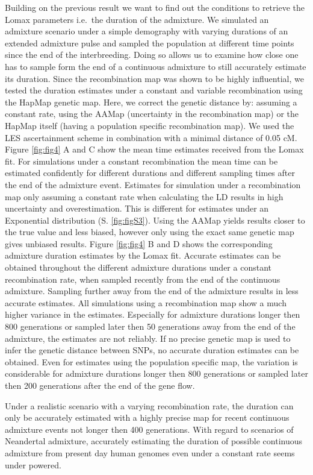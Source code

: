 \documentclass[]{article}
\begin{document}
Building on the previous
result we want to find out the conditions to retrieve the Lomax
parameters i.e.~the duration of the admixture. We simulated an admixture
scenario under a simple demography with varying durations of an extended
admixture pulse and sampled the population at different time points since the
end of the interbreeding. Doing so allows us to examine how close one has to
sample form the end of a continuous admixture to still accurately
estimate its duration. Since the recombination map was shown to be highly
influential, we tested the duration estimates under a constant and variable
recombination using the HapMap genetic map. Here, we correct the
genetic distance by: assuming a constant rate, using the AAMap (uncertainty in the recombination map) or the
HapMap itself (having a  population specific recombination map). We used the LES ascertainment scheme in combination with
a minimal distance of 0.05 cM.  Figure \ref{fig:fig4} A and C show the mean
time estimates received from the Lomax fit. For simulations under a
constant recombination the mean time can be estimated confidently for different durations and different sampling times after the end of the admixture event. Estimates for simulation under a recombination map only
assuming a constant rate when calculating the LD results in high uncertainty and overestimation. This is different for estimates under an Exponential distribution (S.  \ref{fig:figS3}). Using the AAMap yields
results closer to the true value and less biased, however only
using the exact same genetic map gives unbiased results. Figure
\ref{fig:fig4} B and D shows the corresponding admixture duration estimates by the
Lomax fit. Accurate estimates can be obtained throughout the different
admixture durations under a constant recombination rate, when sampled
recently from the end of the continuous admixture. Sampling further away from the end of the admixture results in less accurate estimates.  All simulations using a recombination map show a much higher
variance in the estimates. Especially for admixture durations longer then
800 generations or sampled later then 50 generations away from the end
of the admixture, the estimates are not reliably. If no precise genetic map
is used to infer the genetic distance between SNPs, no accurate
duration estimates can be obtained. Even for estimates using the population specific map, the variation is considerable for admixture durations longer then 800 generations or sampled later then 200 generations after the end of the gene flow.

Under a realistic scenario with a varying recombination
rate, the duration can only be accurately estimated with a highly
precise map for recent continuous admixture events not longer then 400
generations. With regard to scenarios of Neandertal admixture,
accurately estimating the duration of possible continuous admixture from
present day human genomes even under a constant rate seems
under powered. 
\end{document}
